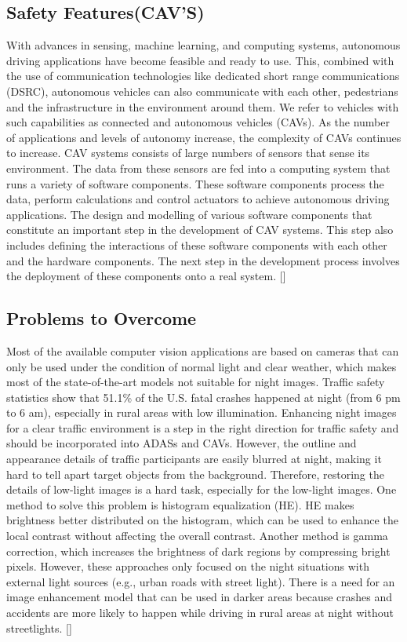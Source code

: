 \documentclass{article}
\begin{document}
\subsection{Safety Features(CAV’S)}

With advances in sensing, machine learning, and computing systems, autonomous driving applications have become feasible and ready to use. This, combined with the use of communication technologies like dedicated short range communications (DSRC), autonomous vehicles can also communicate with each other, pedestrians and the infrastructure in the environment around them. We refer to vehicles with such capabilities as connected and autonomous vehicles (CAVs). As the number of applications and levels of autonomy increase, the complexity of CAVs continues to increase.
\bigbreak
 CAV systems consists of large numbers of sensors that sense its environment. The data from these sensors are fed into a computing system that runs a variety of software components. These software components process the data, perform calculations and control actuators to achieve autonomous driving applications. The design and modelling of various software components that constitute an important step in the development of CAV systems. This step also includes defining the interactions of these software components with each other and the hardware components. The next step in the development process involves the deployment of these components onto a real system. [\textcite{bhat2018tools}]

\subsection{Problems to Overcome}

 Most of the available computer vision applications are based on cameras that can only be used under the condition of normal light and clear weather, which makes most of the state-of-the-art models not suitable for night images. Traffic safety statistics show that 51.1\% of the U.S. fatal crashes happened at night (from 6 pm to 6 am), especially in rural areas with low illumination. Enhancing  night images for a clear traffic environment is a step in the right direction for traffic safety and should be incorporated into ADASs and CAVs.
 \bigbreak
However, the outline and appearance details of traffic participants are easily blurred at night, making it hard to tell apart target objects from the background. Therefore, restoring the details of low-light images is a hard task, especially for the low-light images. One method to solve this problem is histogram equalization (HE). HE makes brightness better distributed on the histogram, which can be used to enhance the local contrast without affecting the overall contrast. Another method is gamma correction, which increases the brightness of dark regions by compressing bright pixels. However, these approaches only focused on the night situations with external light sources (e.g., urban roads with street light). There is a need for an image enhancement model that can be used in darker areas because crashes and accidents are more likely to happen while driving in rural areas at night without streetlights. [\textcite{li2021deep}]
\end{document}
